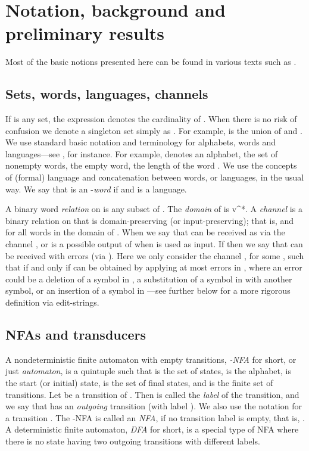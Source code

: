\documentclass{article}
\theoremstyle{plain}
\theoremstyle{definition}
\theoremstyle{remark}
\newcommand{\e}{\lambda}
\newcommand\dsid{\ensuremath{\delta}\xspace}
\newcommand\al{\Sigma}        \newcommand\alG{\Gamma}        \newcommand\eew{(\e/\e)}        \newcommand\ealph{E_\al}   \newcommand\aut{\mathbf{a}}   \newcommand\autb{\mathbf{b}}   \newcommand\tr{\mathbf{t}}    \newcommand\sz[1]{|#1|}       \newcommand\weight[1]{\mathrm{weight}(#1)}       \newcommand\ch{\gamma}        \newcommand\chid{\mathrm{id}} \newcommand\chsid{\mathrm{sid}} \newcommand\dist{\dsid}               \newcommand\inp{\mathrm{inp}}
\begin{document}
\section{Notation, background and preliminary results}\label{sec:two}
Most of the basic notions presented here can be found
in various texts such as
\cite{Be:1979,Wood:1987,FLhandbookI,Yu:handbook,Sak:2009}.

\subsection{Sets, words, languages, channels}
If  is any set, the expression 
denotes the cardinality
of .
When there is no risk of confusion we denote a singleton set  simply as . For example,  is the union of  and .
We use standard basic notation and terminology for alphabets, words and languages---see \cite{MaSa:handbook}, for instance. For example,  denotes an alphabet,  the set of nonempty words,  the empty word,  the length of the word .
We use the concepts of (formal) language and concatenation between words, or languages, in the usual way. We say that  is an -\emph{word} if  and  is a language.
\par
A binary word \emph{relation}  on  is any subset of . The \emph{domain} of  is v\in\al^*.
A \emph{channel}  is a binary relation on  that is domain-preserving (or input-preserving); that is,  and  for all words 
in the domain of . When   we say that  can be received as 
via the channel , or  is a possible output of 
when  is used as input. If  then we say that
 can be received with errors (via ). Here we only
consider the channel , for some , such that
 if and only if  can be obtained by
applying at most   errors in , where an error
could be a deletion of a symbol in , a substitution of a symbol in  with
another symbol, or an insertion of a symbol in ---see further below
for a more rigorous definition via edit-strings.



\subsection{NFAs and transducers}
A  nondeterministic finite automaton
with empty transitions, \emph{-NFA} for short, or
just \emph{automaton}, is a quintuple  such that  is the set of states,  is the alphabet, 
is the start (or initial) state,  is the set of final states, and  is the finite set of transitions. Let  be a transition of . Then   is called the \emph{label} of the transition, and we say that  has an \emph{outgoing} transition (with label ).
We also use the notation  for a transition
.
The -NFA  is called an \emph{NFA}, if no transition label is empty, that is, . A deterministic finite automaton, \emph{DFA} for short, is a special type of NFA where there is no state  having two outgoing transitions with different labels.
\end{document}
